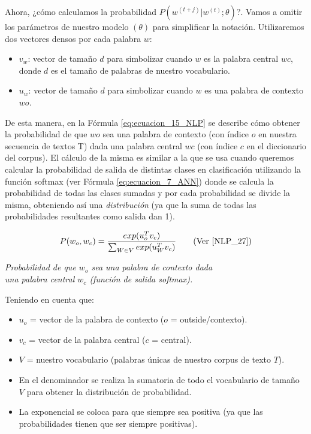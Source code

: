 \documentclass[12pt,a4paper]{article}
\begin{document}
\begin{sloppypar}
Ahora, ¿cómo calculamos la probabilidad $P(w^{(t+j)} | w^{(t)} ; \theta)$?. Vamos a omitir los parámetros de nuestro modelo $(\theta)$ para simplificar la notación. Utilizaremos dos vectores densos por cada palabra $w$:
\begin{itemize}
\item $v_w$: vector de tamaño $d$ para simbolizar cuando $w$ es la palabra central $wc$, donde $d$ es el tamaño de palabras de nuestro vocabulario.
\item $u_w$: vector de tamaño $d$ para simbolizar cuando $w$ es una palabra de contexto $wo$.
\end{itemize}

De esta manera, en la Fórmula \ref{eq:ecuacion_15_NLP} se describe cómo obtener la probabilidad de que $wo$ sea una palabra de contexto (con índice $o$ en nuestra secuencia de textos T) dada una palabra central $wc$ (con índice $c$ en el diccionario del corpus).  El cálculo de la misma es similar a la que se usa cuando queremos calcular la probabilidad de salida de distintas clases en clasificación utilizando la función softmax (ver Fórmula \ref{eq:ecuacion_7_ANN}) donde se calcula la probabilidad de todas las clases sumadas y por cada probabilidad se divide la misma, obteniendo así una \textit{distribución} (ya que la suma de todas las probabilidades resultantes como salida dan 1). 

\begin{equation}\label{eq:ecuacion_15_NLP}
P(w_o, w_c) = \frac{exp(u_{o}^{T} v_c)}{\sum_{W \in V} exp(u_{W}^{T} v_c)}    \qquad \text{(Ver \cite{NLP_27})}
\end{equation}
\begin{center}
\textit{ Probabilidad de que $w_o$ sea una palabra de contexto dada \\ una palabra central $w_c$ (función de salida softmax).}
\end{center}

Teniendo en cuenta que:
\begin{itemize}
\item $u_o$ = vector de la palabra de contexto ($o$ = outside/contexto).
\item $v_c$ = vector de la palabra central ($c$ = central).
\item $V$ = nuestro vocabulario (palabras únicas de nuestro corpus de texto $T$). 
\item En el denominador se realiza la sumatoria de todo el vocabulario de tamaño $V$ para obtener la distribución de probabilidad.
\item La exponencial se coloca para que siempre sea positiva (ya que las probabilidades tienen que ser siempre positivas). \\
\end{itemize}



\end{sloppypar}
\end{document}
